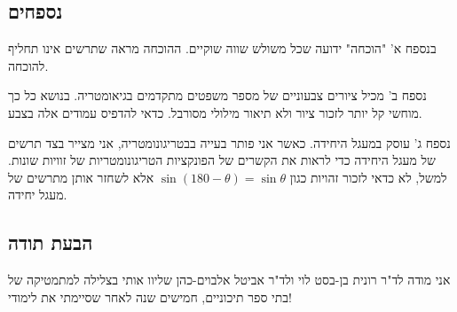 \vspace{-3ex}


\subsection*{נספחים}

בנספח א' "הוכחה" ידועה שכל משולש שווה שוקיים. ההוכחה מראה שתרשים אינו תחליף להוכחה.

נספח ב' מכיל ציורים צבעוניים של מספר משפטים מתקדמים בגיאומטריה. בנושא כל כך מוחשי קל יותר לזכור ציור ולא תיאור מילולי מסורבל. כדאי להדפיס עמודים אלה בצבע.

נספח ג' עוסק במעגל היחידה. כאשר אני פותר בעייה בבטריגונומטריה, אני מצייר בצד תרשים של מעגל היחידה כדי לראות את הקשרים של הפונקציות  הטריגונומטריות של זוויות שונות.  למשל, לא כדאי לזכור זהויות כגון
$\sin (180\!-\!\theta)=\sin \theta$
אלא לשחזר אותן מתרשים של מעגל יחידה.

\subsection*{הבעת תודה}

אני מודה לד"ר רונית בן-בסט לוי ולד"ר אביטל אלבוים-כהן שליוו אותי בצלילה למתמטיקה של בתי ספר תיכוניים, חמישים שנה לאחר שסיימתי את לימודי!

\npchap
